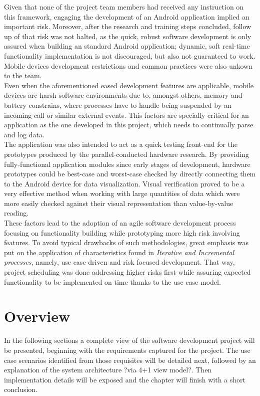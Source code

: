 	Given that none of the project team members had received any instruction on this framework, engaging the development of an Android application implied an important risk. Moreover, after the research and training steps concluded, follow up of that risk was not halted, as the quick, robust software development is only assured when building an standard Android application; dynamic, soft real-time functionality implementation is not discouraged, but also not guaranteed to work.
	Mobile devices development restrictions and common practices were also unkown to the team.\\

	Even when the aforementioned eased development features are applicable, mobile devices are harsh software environments due to, amongst others, memory and battery constrains, where processes have to handle being suspended by an incoming call or similar external events. This factors are specially critical for an application as the one developed in this project, which needs to continually parse and log data.\\

	The application was also intended to act as a quick testing front-end for the prototypes produced by the parallel-conducted hardware research. By providing fully-functional application modules since early stages of development, hardware prototypes could be best-case and worst-case checked by directly connecting them to the Android device for data visualization. Visual verification proved to be a very effective method when working with large quantities of data which were more easily checked against their visual representation than value-by-value reading.\\

	These factors lead to the adoption of an agile software development process focusing on functionality building while prototyping more high risk involving features. To avoid typical drawbacks of such methodologies, great emphasis was put on the application of characteristics found in \textit{Iterative and Incremental processes}, namely, use case driven and risk focused development. That way, project scheduling was done addressing higher risks first while assuring expected functionality to be implemented on time thanks to the use case model.\\

	\section{Overview}
	In the following sections a complete view of the software development project will be presented, beginning with the requirements captured for the project. The use case scenarios identified from those requisites will be detailed next, followed by an explanation of the system architecture ?via 4+1 view model?. Then implementation details will be exposed and the chapter will finish with a short conclusion.


